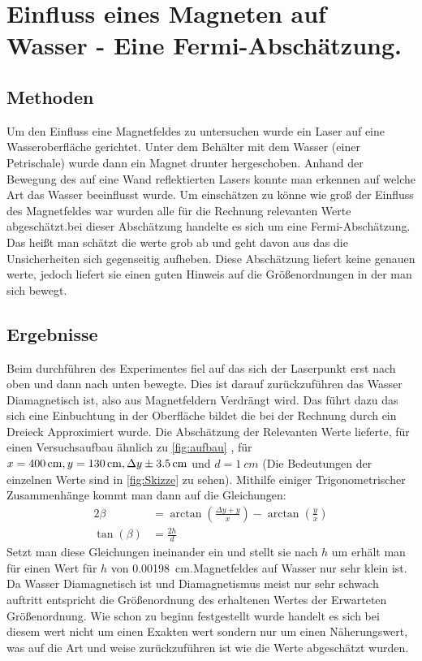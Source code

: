 \section[Einfluss eines Magneten auf Wasser]{Einfluss eines Magneten auf Wasser - Eine Fermi-Abschätzung. }\label{Kap:Fermi}
\subsection{Methoden}
Um den Einfluss eine Magnetfeldes zu untersuchen wurde ein Laser auf eine Wasseroberfläche gerichtet. Unter dem Behälter mit dem Wasser (einer Petrischale) wurde dann ein Magnet drunter hergeschoben. Anhand der Bewegung des auf eine Wand reflektierten Lasers konnte man erkennen auf welche Art das Wasser beeinflusst wurde.
Um einschätzen zu könne wie groß der Einfluss des Magnetfeldes war wurden alle für die Rechnung relevanten Werte abgeschätzt.bei dieser Abschätzung handelte es sich um eine Fermi-Abschätzung. Das heißt man schätzt die werte grob ab und geht davon aus das die Unsicherheiten sich gegenseitig aufheben. Diese Abschätzung liefert keine genauen werte, jedoch liefert sie einen guten Hinweis  auf die Größenordnungen in der man sich bewegt.
\subsection{Ergebnisse}
Beim durchführen des Experimentes fiel auf das sich der Laserpunkt erst nach oben und dann nach unten bewegte. Dies ist darauf zurückzuführen das Wasser Diamagnetisch ist, also aus Magnetfeldern Verdrängt wird. Das führt dazu das sich eine Einbuchtung in der Oberfläche bildet die bei der Rechnung durch ein Dreieck Approximiert wurde.
Die Abschätzung der Relevanten Werte lieferte, für einen Versuchsaufbau ähnlich zu \cref{fig:aufbau} , für $x=\SI{400}{cm}, y=\SI{130}{cm}, \Delta y\SI{+- 3,5}{cm}$ und $d=\SI{1}{cm}$ (Die Bedeutungen der einzelnen Werte sind in \cref{fig:Skizze} zu sehen). Mithilfe einiger Trigonometrischer Zusammenhänge kommt man dann auf die Gleichungen:
\begin{align}
	2\beta &= \arctan \left(\frac{\Delta y + y}{x}\right)  - \arctan\left( \frac{y}{x}\right)\\ 
	\tan(\beta) &= \frac{2h}{d}
\end{align}
Setzt man diese Gleichungen ineinander ein und stellt sie nach $h$ um erhält man für einen Wert für $h$ von \SI{0,00198}{cm}.Magnetfeldes auf Wasser nur sehr klein ist. Da Wasser Diamagnetisch ist und Diamagnetismus meist nur sehr schwach auftritt entspricht die Größenordnung des erhaltenen Wertes der Erwarteten Größenordnung.
Wie schon zu beginn festgestellt wurde handelt es sich bei diesem wert nicht um einen Exakten wert sondern nur um einen Näherungswert, was auf die Art und weise zurückzuführen ist wie die Werte abgeschätzt wurden.



